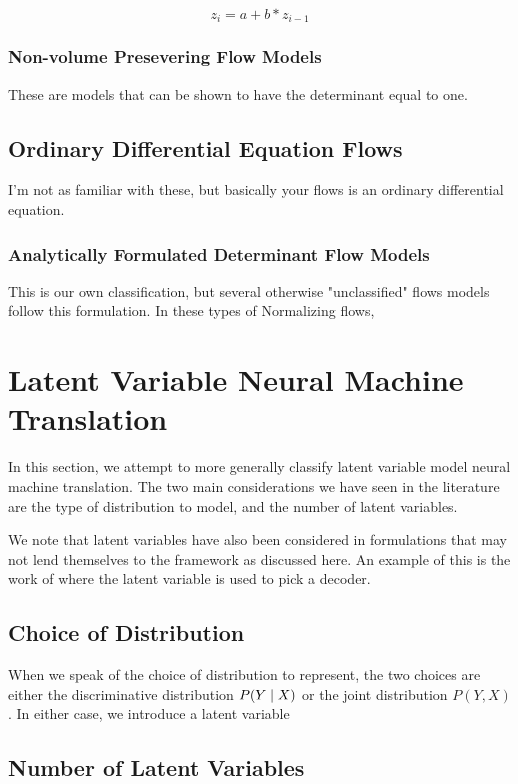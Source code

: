 \begin{equation}
	 z_{i} = a + b * z_{i-1}		
\end{equation}

\subsubsection{Non-volume Presevering Flow Models} 
These are models that can be shown to have the determinant equal to one. 

\subsection{Ordinary Differential Equation Flows}

I'm not as familiar with these, but basically your flows is an ordinary differential equation. 

\subsubsection{Analytically Formulated Determinant Flow Models}
This is our own classification, but several otherwise "unclassified" flows models follow this formulation. In these types of Normalizing flows,


\section{Latent Variable Neural Machine Translation}

In this section, we attempt to more generally classify latent variable model neural machine translation. The two main considerations we have seen in the literature are the type of distribution to model, and the number of latent variables. 

We note that latent variables have also been considered in formulations that may not lend themselves to the framework as discussed here. An example of this is the work of  where the latent variable is used to pick a decoder. 

\subsection{Choice of Distribution}

When we speak of the choice of distribution to represent, the two choices are either the discriminative distribution $P(Y \; | \;{X})$ or the joint distribution $P(Y , X)$. In either case, we introduce a latent variable 

\subsection{Number of Latent Variables}





